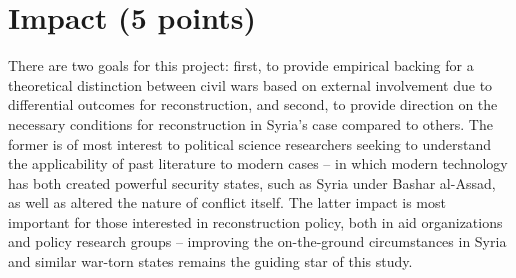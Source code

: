\documentclass[11pt]{article}
\begin{document}
\section{Impact (5 points)}

There are two goals for this project: first, to provide empirical backing for a theoretical distinction between civil wars based on external involvement due to differential outcomes for reconstruction, and second, to provide direction on the necessary conditions for reconstruction in Syria’s case compared to others. The former is of most interest to political science researchers seeking to understand the applicability of past literature to modern cases – in which modern technology has both created powerful security states, such as Syria under Bashar al-Assad, as well as altered the nature of conflict itself. The latter impact is most important for those interested in reconstruction policy, both in aid organizations and policy research groups – improving the on-the-ground circumstances in Syria and similar war-torn states remains the guiding star of this study.
\end{document}
